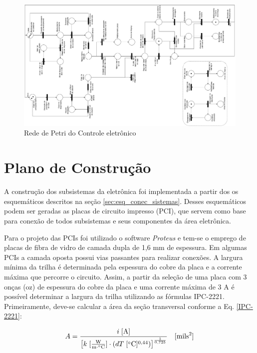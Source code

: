 \begin{figure}[H]
    \centering
    \includegraphics[width=1.4\textwidth, angle = -90]{figuras/eletronica/fluxogramas/petri.pdf}
    \caption{Rede de Petri do Controle eletrônico}
    \label{fig:rede_petri}
\end{figure}



\section{Plano de Construção}
\label{sec:plano_de_construção}

A construção dos subsistemas da eletrônica foi implementada a partir dos os esquemáticos descritos na seção \ref{sec:esq_conec_sistemas}. Desses esquemáticos podem ser geradas as placas de circuito impresso (PCI), que servem como base para conexão de todos subsistemas e seus componentes da área eletrônica. 

Para o projeto das PCIs foi utilizado o software \textit{Proteus} e tem-se o emprego de placas de fibra de vidro de camada dupla de 1,6 mm de espessura. Em algumas PCIs a camada oposta possui vias passantes para realizar conexões. A largura mínima da trilha é determinada pela espessura do cobre da placa e a corrente máxima que percorre o circuito. Assim, a partir da seleção de uma placa com 3 onças (oz) de espessura do cobre da placa e uma corrente máxima de 3 A é possível determinar a largura da trilha utilizando as fórmulas IPC-2221. Primeiramente, deve-se calcular a área da seção transversal conforme a Eq. \ref{IPC-2221}:

\begin{equation}\label{IPC-2221}
    A = \frac{i \; [\text{A}]}{\left[ k \; [\frac{\text{W}}{\text{m} \cdot ^\circ \text{C}}] \cdot(dT \; [^\circ \text{C}]\textsuperscript{0,44})\right]^{\frac{1}{0,725}} } \quad [\text{mils}^2]
\end{equation}

